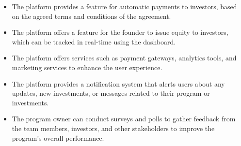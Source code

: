 \begin{itemize}
\item The platform provides a feature for automatic payments to investors, based on the agreed terms and conditions of the agreement.
\item The platform offers a feature for the founder to issue equity to investors, which can be tracked in real-time using the dashboard.
\item The platform offers services such as payment gateways, analytics tools, and marketing services to enhance the user experience.
\item The platform provides a notification system that alerts users about any updates, new investments, or messages related to their program or investments.
\item The program owner can conduct surveys and polls to gather feedback from the team members, investors, and other stakeholders to improve the program's overall performance.
\end{itemize}
